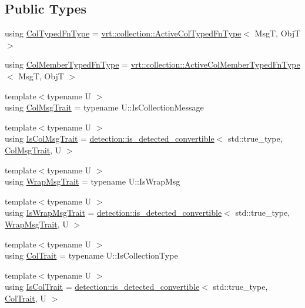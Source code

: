 \subsection*{Public Types}
\begin{DoxyCompactItemize}
\item 
using \hyperlink{structvt_1_1auto__registry_1_1_handlers_dispatcher_ad45c828eebdd2a18ffc0aa64f542a85c}{Col\+Typed\+Fn\+Type} = \hyperlink{namespacevt_1_1vrt_1_1collection_a939327f58a5838cf9d7dcc7f14d1670c}{vrt\+::collection\+::\+Active\+Col\+Typed\+Fn\+Type}$<$ MsgT, ObjT $>$
\item 
using \hyperlink{structvt_1_1auto__registry_1_1_handlers_dispatcher_a6f1a72ba3eec14527af044a478416b4d}{Col\+Member\+Typed\+Fn\+Type} = \hyperlink{namespacevt_1_1vrt_1_1collection_a87925616c03cf4ccc548d33b2fe172ee}{vrt\+::collection\+::\+Active\+Col\+Member\+Typed\+Fn\+Type}$<$ MsgT, ObjT $>$
\item 
{\footnotesize template$<$typename U $>$ }\\using \hyperlink{structvt_1_1auto__registry_1_1_handlers_dispatcher_aa2e8b80baa4dffdd9b2476ca9d2a7b46}{Col\+Msg\+Trait} = typename U\+::\+Is\+Collection\+Message
\item 
{\footnotesize template$<$typename U $>$ }\\using \hyperlink{structvt_1_1auto__registry_1_1_handlers_dispatcher_a585421b015b2d94915817c509e38b073}{Is\+Col\+Msg\+Trait} = \hyperlink{namespacedetection_afb970b23e39cfecb33449d40242c49ff}{detection\+::is\+\_\+detected\+\_\+convertible}$<$ std\+::true\+\_\+type, \hyperlink{structvt_1_1auto__registry_1_1_handlers_dispatcher_aa2e8b80baa4dffdd9b2476ca9d2a7b46}{Col\+Msg\+Trait}, U $>$
\item 
{\footnotesize template$<$typename U $>$ }\\using \hyperlink{structvt_1_1auto__registry_1_1_handlers_dispatcher_a316ed070238aa9a3bc8dd3f8d00109f2}{Wrap\+Msg\+Trait} = typename U\+::\+Is\+Wrap\+Msg
\item 
{\footnotesize template$<$typename U $>$ }\\using \hyperlink{structvt_1_1auto__registry_1_1_handlers_dispatcher_ad4c44b0bdc40d4ea339a1a1a3c1a3351}{Is\+Wrap\+Msg\+Trait} = \hyperlink{namespacedetection_afb970b23e39cfecb33449d40242c49ff}{detection\+::is\+\_\+detected\+\_\+convertible}$<$ std\+::true\+\_\+type, \hyperlink{structvt_1_1auto__registry_1_1_handlers_dispatcher_a316ed070238aa9a3bc8dd3f8d00109f2}{Wrap\+Msg\+Trait}, U $>$
\item 
{\footnotesize template$<$typename U $>$ }\\using \hyperlink{structvt_1_1auto__registry_1_1_handlers_dispatcher_a0d707c7f0650f1185b5628aa71a98c87}{Col\+Trait} = typename U\+::\+Is\+Collection\+Type
\item 
{\footnotesize template$<$typename U $>$ }\\using \hyperlink{structvt_1_1auto__registry_1_1_handlers_dispatcher_aa5e51c30b4d5124a98d04bdc2be043ac}{Is\+Col\+Trait} = \hyperlink{namespacedetection_afb970b23e39cfecb33449d40242c49ff}{detection\+::is\+\_\+detected\+\_\+convertible}$<$ std\+::true\+\_\+type, \hyperlink{structvt_1_1auto__registry_1_1_handlers_dispatcher_a0d707c7f0650f1185b5628aa71a98c87}{Col\+Trait}, U $>$
\end{DoxyCompactItemize}
